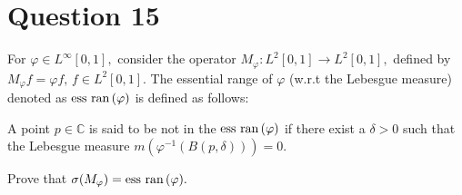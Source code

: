 \section{Question 15}
\horz

For $\varphi \in L^{\infty}[0,1],$ consider the operator $M_{\varphi}: L^2[0,1]\to L^2[0,1],$ defined by $M_{\varphi} f= \varphi f,\,f\in L^2[0,1].$ The essential range of $\varphi$ (w.r.t the Lebesgue measure) denoted as $ \mbox{ess ran\,} (\varphi) $ is defined  as follows:

A point $p\in \mathbb C$ is said to be not in the $ \mbox{ess ran\,} (\varphi) $ if there exist a $\delta >0$ such that the Lebesgue measure $m (\varphi^{-1}(B(p, \delta))) =0.$

Prove that $\sigma(M_{\varphi})=  \mbox{ess ran\,} (\varphi).$

\horz

